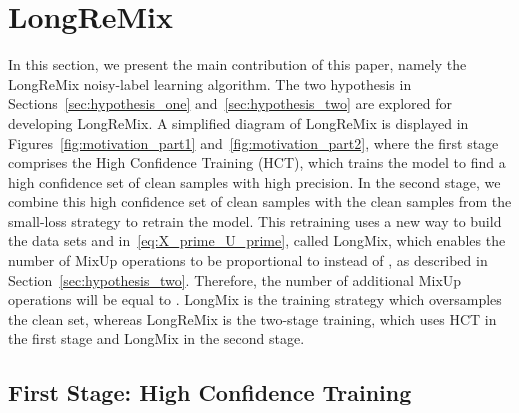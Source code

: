 \documentclass[review]{elsarticle}
\begin{document}
\section{LongReMix}
\label{sec:LongReMix}






















































In this section, we present the main contribution of this paper, namely the LongReMix noisy-label learning algorithm.
The two hypothesis in Sections~\ref{sec:hypothesis_one} and~\ref{sec:hypothesis_two}
are explored for developing LongReMix.
A simplified diagram of LongReMix is displayed in Figures~\ref{fig:motivation_part1} and~\ref{fig:motivation_part2},
where the first stage comprises the High Confidence Training (HCT), which trains the model to find a high confidence set of clean samples with high precision. 
In the second stage, we combine this high confidence set of clean samples with the clean samples from the small-loss strategy to retrain the model. 
This retraining uses a new way to build the data sets  and  in~\eqref{eq:X_prime_U_prime}, called LongMix,
which enables the number of MixUp operations to be proportional to  instead of  , as described in Section~\ref{sec:hypothesis_two}. Therefore, the number of additional MixUp operations will be equal to . 
LongMix is the training strategy which  oversamples the clean set, whereas LongReMix is the two-stage training, which uses HCT in the first stage and LongMix in the second stage.

\subsection{First Stage: High Confidence Training}
\label{sec:HCT}
\end{document}
